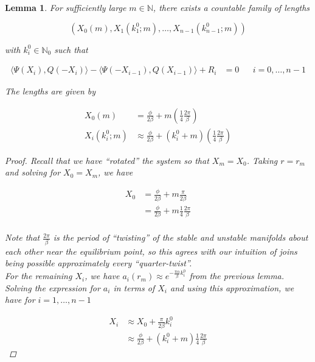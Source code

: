 \documentclass[12pt]{article}
\def\N{{\mathbb N}}
\newtheorem{lemma}{Lemma}
\begin{document}
\begin{lemma}
For sufficiently large $m \in \N$, there exists a countable family of lengths

\[
(X_0(m), X_1(k_1^0; m), \dots, X_{n-1}(k_{n-1}^0; m))
\]

with $k_i^0 \in \N_0$ such that

\begin{align*}
\langle \Psi(X_i), Q(-X_i) \rangle - \langle \Psi(-X_{i-1}), Q(X_{i-1}) \rangle + R_i &= 0 && i = 0, \dots, n-1
\end{align*}

The lengths are given by

\begin{align*}
X_0(m) &= \frac{\phi}{2 \beta} + m \left( \frac{1}{4} \frac{2 \pi}{\beta} \right) \\
X_i(k_i^0; m) &\approx \frac{\phi}{2 \beta} + (k_i^0 + m) \left( \frac{1}{4} \frac{2 \pi}{\beta}\right)
\end{align*}

\begin{proof}

Recall that we have ``rotated'' the system so that $X_m = X_0$. Taking $r = r_m$ and solving for $X_0 = X_m$, we have 

\begin{align*}
X_0 &= \frac{\phi}{2 \beta} + m \frac{\pi}{2 \beta} \\
&= \frac{\phi}{2 \beta} + m \frac{1}{4} \frac{2 \pi}{\beta} \\
\end{align*}

Note that $\frac{2 \pi}{\beta}$ is the period of ``twisting'' of the stable and unstable manifolds about each other near the equilibrium point, so this agrees with our intuition of joins being possible approximately every ``quarter-twist''.\\

For the remaining $X_i$, we have $a_i(r_m) \approx e^{-\frac{\pi \alpha}{\beta} k_i^0 }$ from the previous lemma. Solving the expression for $a_i$ in terms of $X_i$ and using this approximation, we have for $i = 1, \dots, n-1$

\begin{align*}
X_i &\approx X_0 + \frac{\pi}{2 \beta}k_i^0 \\
&\approx \frac{\phi}{2 \beta} + (k_i^0 + m) \frac{1}{4} \frac{2 \pi}{\beta} 
\end{align*}

\end{proof}
\end{lemma}
\end{document}
